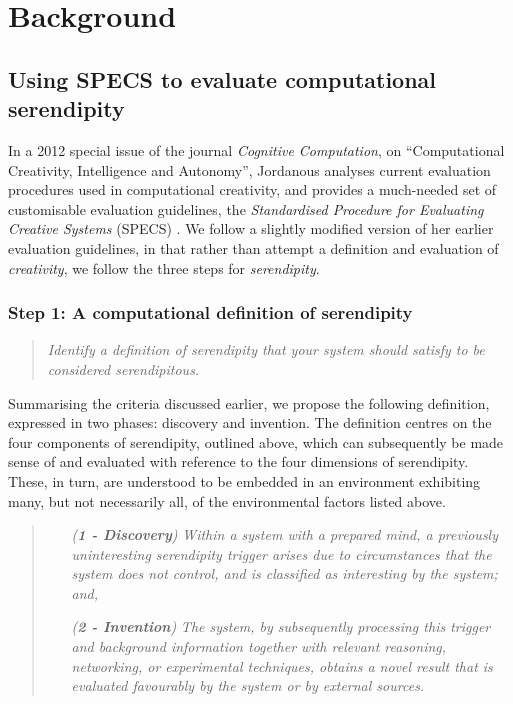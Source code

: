 \section{Background}

\subsection{Using SPECS to evaluate computational serendipity}\label{specs-overview}

In a 2012 special issue of the journal {\em Cognitive Computation}, on
``Computational Creativity, Intelligence and Autonomy'', Jordanous
analyses current evaluation procedures used in computational
creativity, and provides a much-needed set of customisable evaluation
guidelines, the \emph{Standardised Procedure for Evaluating Creative
  Systems} (SPECS) \cite{jordanous:12}.
%
We follow a slightly modified version of her earlier evaluation
guidelines, in that rather than attempt a definition and evaluation of
{\em creativity}, we follow the three steps for \emph{serendipity}.

\subsubsection*{Step 1: A computational definition of serendipity}
\begin{quote} {\em Identify a definition of serendipity that your
    system should satisfy to be considered serendipitous.}\end{quote}

Summarising the criteria discussed earlier, we propose the following
definition, expressed in two phases: discovery and invention.  The
definition centres on the four components of serendipity, outlined
above, which can subsequently be made sense of and evaluated with
reference to the four dimensions of serendipity.  These, in turn, are
understood to be embedded in an environment exhibiting many, but not
necessarily all, of the environmental factors listed above.

\begin{quote}
\begin{enumerate}[itemsep=2pt,labelwidth=9em,leftmargin=6em,rightmargin=2em]
\item[\emph{(\textbf{1 - Discovery})}] \emph{Within a system with a prepared mind, a previously uninteresting serendipity trigger arises due to circumstances that the system does not control, and is classified as interesting by the system; and,}
\item[\emph{(\textbf{2 - Invention})}] \emph{The system, by subsequently processing this trigger and background information together with relevant reasoning, networking, or experimental techniques, obtains a novel result that is evaluated favourably by the system or by external sources.}
\end{enumerate}
\end{quote}

